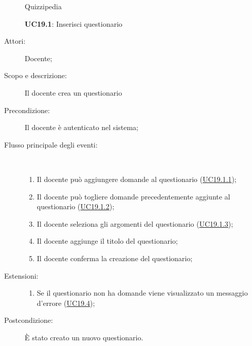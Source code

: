 	\begin{figure}[H]
		\centering
		\begin{resizedtikzpicture}{\textwidth}
		\begin{umlsystem}[x=0, fill=lightgray!20]{Quizzipedia}
		\end{umlsystem}
		\end{resizedtikzpicture}
		\caption{\textbf{UC19.1}: Inserisci questionario}
		\label{UC19.1}
	\end{figure}
\begin{description}
\item[Attori:] Docente;
\item[Scopo e descrizione:] Il docente crea un questionario
      \item[Precondizione:] Il docente è autenticato nel sistema;

        \item[Flusso principale degli eventi:] \ 
 \begin{enumerate}
          \item Il docente può aggiungere domande al questionario (\hyperlink{UC19.1.1}{UC19.1.1});
          \item Il docente può togliere domande precedentemente aggiunte al questionario (\hyperlink{UC19.1.2}{UC19.1.2});
          \item Il docente seleziona gli argomenti del questionario (\hyperlink{UC19.1.3}{UC19.1.3});
          \item Il docente aggiunge il titolo del questionario;
          \item Il docente conferma la creazione del questionario;

      \end{enumerate}
    \item[Estensioni:]
      \begin{enumerate}
          \item Se il questionario non ha domande viene visualizzato un messaggio d'errore (\hyperlink{UC19.4}{UC19.4});

      \end{enumerate}
    \item[Postcondizione:] È stato creato un nuovo questionario.
  \end{description}
\hypertarget{UC19.1.1}{}
